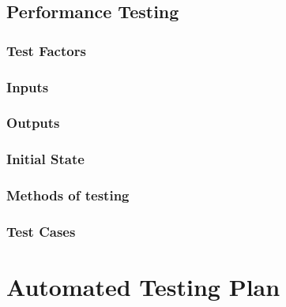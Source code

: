 \documentclass[12pt]{article}
\begin{document}
\subsection{Performance Testing}
\subsubsection{Test Factors}
\subsubsection{Inputs}
\subsubsection{Outputs}
\subsubsection{Initial State}
\subsubsection{Methods of testing}
\subsubsection{Test Cases}

\section{Automated Testing Plan}
\end{document}
